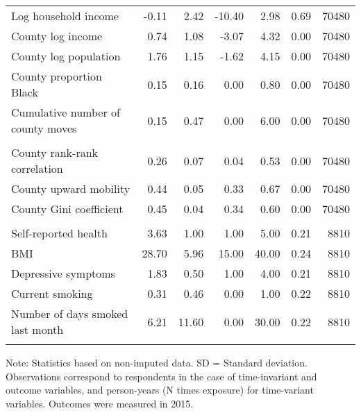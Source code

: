 \begin{table}[htp]
\begin{threeparttable}
\begin{tabular}{lrrrrrr}
  \quad Log household income & -0.11 & 2.42 & -10.40 & 2.98 & 0.69 & 70480 \\ 
  \quad County log income & 0.74 & 1.08 & -3.07 & 4.32 & 0.00 & 70480 \\ 
  \quad County log population & 1.76 & 1.15 & -1.62 & 4.15 & 0.00 & 70480 \\ 
  \quad County proportion Black & 0.15 & 0.16 & 0.00 & 0.80 & 0.00 & 70480 \\ 
  \quad Cumulative number of county moves & 0.15 & 0.47 & 0.00 & 6.00 & 0.00 & 70480 \\ 
   \addlinespace
\multicolumn{7}{l}{\textit{Exposure variables}} \\
\addlinespace
\quad County rank-rank correlation & 0.26 & 0.07 & 0.04 & 0.53 & 0.00 & 70480 \\ 
  \quad County upward mobility & 0.44 & 0.05 & 0.33 & 0.67 & 0.00 & 70480 \\ 
  \quad County Gini coefficient & 0.45 & 0.04 & 0.34 & 0.60 & 0.00 & 70480 \\ 
   \addlinespace
\multicolumn{7}{l}{\textit{Outcomes}} \\
\addlinespace
\quad Self-reported health & 3.63 & 1.00 & 1.00 & 5.00 & 0.21 & 8810 \\ 
  \quad BMI & 28.70 & 5.96 & 15.00 & 40.00 & 0.24 & 8810 \\ 
  \quad Depressive symptoms & 1.83 & 0.50 & 1.00 & 4.00 & 0.21 & 8810 \\ 
  \quad Current smoking & 0.31 & 0.46 & 0.00 & 1.00 & 0.22 & 8810 \\ 
  \quad Number of days smoked last month & 6.21 & 11.60 & 0.00 & 30.00 & 0.22 & 8810 \\ 
   \addlinespace
\hline
\addlinespace
\end{tabular}
\begin{tablenotes}
\scriptsize
\item Note: Statistics based on non-imputed data. SD = Standard deviation. Observations correspond to respondents in the case of time-invariant and outcome variables, and person-years (N times exposure) for time-variant variables. Outcomes were measured in 2015.
\end{tablenotes}
\end{threeparttable}
\end{table}
